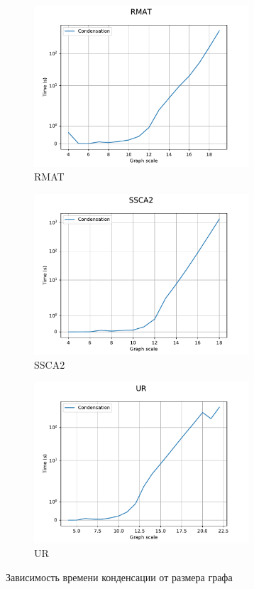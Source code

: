 \documentclass[12pt,a4paper,oneside,openany]{article}
\theoremstyle{definition}
\theoremstyle{lemma}
\theoremstyle{remark}
\begin{document}
\begin{figure}[H]
    \begin{subfigure}{.5\textwidth}
      \centering
      \includegraphics[width=8cm]{images/condensation_RMAT.pdf}
      \caption{RMAT}
      \label{fig:condensation:rmat}
    \end{subfigure}
    \begin{subfigure}{.5\textwidth}
      \centering
      \includegraphics[width=8cm]{images/condensation_SSCA2.pdf}
      \caption{SSCA2}
      \label{fig:condensation:ssca}
    \end{subfigure}
    \begin{subfigure}{.5\textwidth}
      \centering
      \includegraphics[width=8cm]{images/condensation_UR.pdf}
      \caption{UR}
      \label{fig:condensation:ur}
    \end{subfigure}
    \caption{Зависимость времени конденсации от размера графа}
    \label{fig:condensation}
\end{figure}
\end{document}
